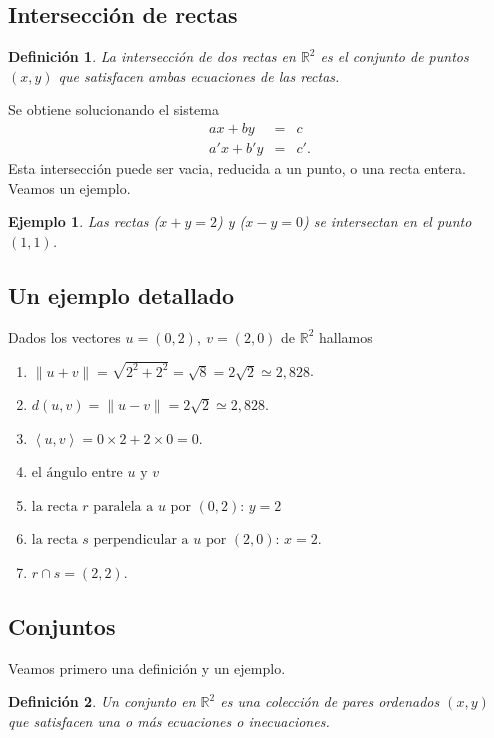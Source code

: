 \documentclass[11pt]{book}
\newcommand{\R}{\mathbb{R}}
\theoremstyle{definicion}
\theoremstyle{teorema}
\theoremstyle{ejemplo}
\newtheorem{definition}{Definición}
\newtheorem{example}{Ejemplo}
\begin{document}
\subsection{Intersección de rectas}
\begin{definition}
La intersección de dos rectas en \(\mathbb{R}^2\) es el conjunto de puntos \((x, y)\) que satisfacen ambas ecuaciones de las rectas.
\end{definition}
Se obtiene solucionando el sistema
\begin{eqnarray*}
    a x + by &=& c\\
    a' x + b'y &=& c'.
\end{eqnarray*}
Esta intersecci\'on puede ser vacia, reducida a un punto, o una recta entera. Veamos un ejemplo.

\begin{example}
Las rectas (\(x + y = 2\)) y (\(x - y = 0\)) se intersectan en el punto \((1, 1)\).
\end{example}


\subsection{Un ejemplo detallado}

\noindent Dados los vectores $u=(0,2),\ v=(2,0)$ de $\R^2$ hallamos
\begin{enumerate}
    \item $\parallel u + v \parallel = \sqrt{2^2 + 2^2} = \sqrt{8} = 2 \sqrt{2} \simeq 2,828$.
    \item ${d(u,v)} =
    \parallel u - v \parallel
    = 2 \sqrt{2} \simeq 2,828$. 
    \item $\left<u,v\right> = 0\times 2 + 2 \times 0 = 0$.
    \item ${\mbox{el \'angulo entre } u \mbox{ y } v}$
    \item ${\mbox{la recta } r \mbox{ paralela a }u\mbox{ por }(0,2)}$: 
    $y=2$  
    \item ${\mbox{la recta } s \mbox{ perpendicular a }u\mbox{ por }(2,0)}$:
    $x=2$.
    \item ${r\cap s} = (2,2).$

\end{enumerate}

\subsection{Conjuntos}

\noindent Veamos primero una definici\'on y un ejemplo.
\begin{definition}
Un conjunto en \(\mathbb{R}^2\) es una colección de pares ordenados \((x, y)\) que satisfacen una o más ecuaciones o inecuaciones.
\end{definition}
\end{document}
